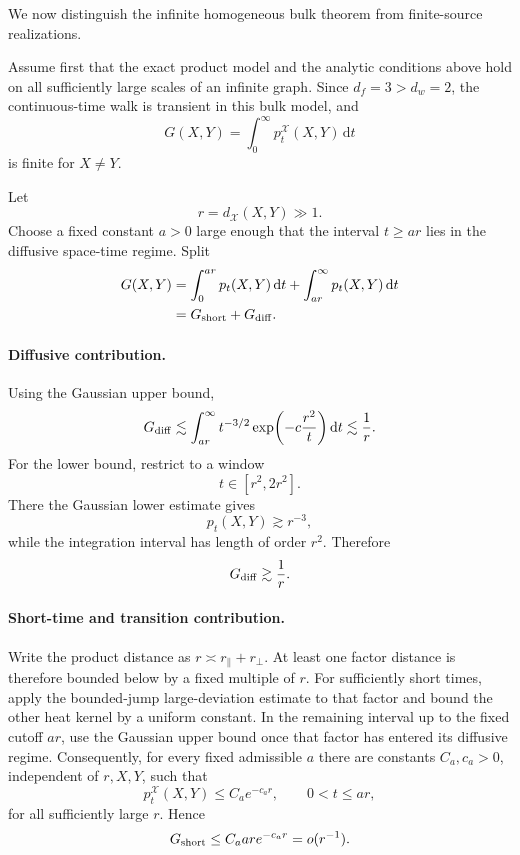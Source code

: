 \documentclass[11pt]{article}
\newcommand{\dd}{\mathrm{d}}
\newcommand{\cX}{\mathcal{X}}
\begin{document}
We now distinguish the infinite homogeneous bulk theorem from finite-source realizations.

Assume first that the exact product model and the analytic conditions above hold on all sufficiently large scales of an infinite graph. Since \(d_f=3>d_w=2\), the continuous-time walk is transient in this bulk model, and
\begin{equation}
G(X,Y)
=
\int_0^\infty p_t^{\cX}(X,Y)\,\dd t
\end{equation}
is finite for \(X\ne Y\).

Let
\[
r=d_{\cX}(X,Y)\gg1.
\]
Choose a fixed constant \(a>0\) large enough that the interval \(t\ge ar\) lies in the diffusive space-time regime. Split
\begin{equation}
\begin{aligned}
G(X,Y)
&=
\int_0^{ar}p_t(X,Y)\,\dd t
+
\int_{ar}^{\infty}p_t(X,Y)\,\dd t\\
&=
G_{\rm short}+G_{\rm diff}.
\end{aligned}
\label{eq:greensplit}
\end{equation}

\paragraph{Diffusive contribution.}
Using the Gaussian upper bound,
\begin{equation}
G_{\rm diff}
\lesssim
\int_{ar}^{\infty}
t^{-3/2}
\exp\!\left(-c\frac{r^2}{t}\right)\dd t
\lesssim
\frac{1}{r}.
\end{equation}
For the lower bound, restrict to a window
\[
t\in[r^2,2r^2].
\]
There the Gaussian lower estimate gives
\[
p_t(X,Y)\gtrsim r^{-3},
\]
while the integration interval has length of order \(r^2\). Therefore
\begin{equation}
G_{\rm diff}\gtrsim \frac{1}{r}.
\end{equation}

\paragraph{Short-time and transition contribution.}
Write the product distance as \(r\asymp r_\parallel+r_\perp\). At least one factor distance is therefore bounded below by a fixed multiple of \(r\). For sufficiently short times, apply the bounded-jump large-deviation estimate to that factor and bound the other heat kernel by a uniform constant. In the remaining interval up to the fixed cutoff \(ar\), use the Gaussian upper bound once that factor has entered its diffusive regime. Consequently, for every fixed admissible \(a\) there are constants \(C_a,c_a>0\), independent of \(r,X,Y\), such that
\begin{equation}
p_t^{\cX}(X,Y)
\le
C_a e^{-c_a r},
\qquad 0<t\le ar,
\end{equation}
for all sufficiently large \(r\). Hence
\begin{equation}
G_{\rm short}
\le
C_a ar e^{-c_a r}
=
o(r^{-1}).
\end{equation}
\end{document}

